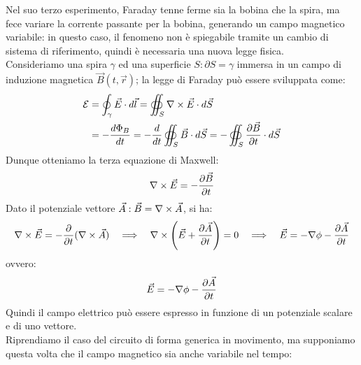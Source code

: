 \documentclass[]{article}
\newcommand{\E}{\mathcal{E}}
\begin{document}
Nel suo terzo esperimento, Faraday tenne ferme sia la bobina che la spira, ma fece variare la corrente passante per la bobina, generando un campo magnetico variabile: in questo caso, il fenomeno non è spiegabile tramite un cambio di sistema di riferimento, quindi è necessaria una nuova legge fisica. \\ 
%
Consideriamo una spira $ \gamma $ ed una superficie $ S : \partial S = \gamma $ immersa in un campo di induzione magnetica $ \vec{B}(t,\vec{r}) $; la legge di Faraday può essere sviluppata come:
\begin{equation}
	\begin{split}
		\E &= \oint_{\gamma} \vec{E} \cdot d\vec{l} = \oiint_S \rot\vec{E} \cdot d\vec{S} \\ 
		   &= -\frac{d\Phi_B}{dt} = -\frac{d}{dt} \oiint_S \vec{B}\cdot d\vec{S} = - \oiint_S \frac{\partial\vec{B}}{\pa t} \cdot d\vec{S}
	\end{split}
	\label{eq:10}
\end{equation}
Dunque otteniamo la terza equazione di Maxwell:
\begin{equation}
	\nabla\times\vec{E} = -\frac{\partial\vec{B}}{\partial t}
	\label{eq:11}
\end{equation}
Dato il potenziale vettore $ \vec{A} : \vec{B} = \nabla\times\vec{A} $, si ha:
\begin{equation}
	\nabla\times\vec{E} = -\frac{\partial}{\partial t} (\nabla\times\vec{A}) \quad\Longrightarrow\quad \nabla\times\left(\vec{E} + \frac{\partial\vec{A}}{\partial t}\right) = 0 \quad\Longrightarrow\quad \vec{E} = -\nabla\phi - \frac{\partial\vec{A}}{\partial t}
	\label{eq:12}
\end{equation}
ovvero:
\begin{equation}
	\vec{E} = -\nabla\phi - \frac{\partial\vec{A}}{\partial t}
	\label{eq:13}
\end{equation}
Quindi il campo elettrico può essere espresso in funzione di un potenziale scalare e di uno vettore. \\ 
%
Riprendiamo il caso del circuito di forma generica in movimento, ma supponiamo questa volta che il campo magnetico sia anche variabile nel tempo:
\end{document}
